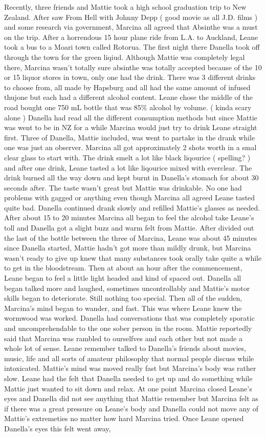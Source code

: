\documentclass[12pt]{book}
\begin{document}
Recently, three friends and Mattie took a high school graduation trip to New Zealand. After saw From Hell with Johnny Depp ( good movie as all J.D. films ) and some research via government, Marcina all agreed that Absinthe was a must on the trip. After a horrendous 15 hour plane ride from L.A. to Auckland, Leane took a bus to a Moari town called Rotorua. The first night there Danella took off through the town for the green liqiud. Although Mattie was completely legal there, Marcina wasn't totally sure absinthe was totally accepted because of the 10 or 15 liquor stores in town, only one had the drink. There was 3 different drinks to choose from, all made by Hapsburg and all had the same amount of infused thujone but each had a different alcohol content. Leane chose the middle of the road bought one 750 mL bottle that was 85\% alcohol by volume. ( kinda scary alone ) Danella had read all the different consumption methods but since Mattie was went to be in NZ for a while Marcina would just try to drink Leane straight first. Three of Danella, Mattie included, was went to partake in the drank while one was just an observer. Marcina all got approximately 2 shots worth in a smal clear glass to start with. The drink smelt a lot like black liqourice ( spelling? ) and after one drink, Leane tasted a lot like liqourice mixed with everclear. The drink burned all the way down and kept burnt in Danella's stomach for about 30 seconds after. The taste wasn't great but Mattie was drinkable. No one had problems with gagged or anything even though Marcina all agreed Leane tasted quite bad. Danella continued drank slowly and refilled Mattie's glasses as needed. After about 15 to 20 minutes Marcina all began to feel the alcohol take Leane's toll and Danella got a slight buzz and warm felt from Mattie. After divided out the last of the bottle between the three of Marcina, Leane was about 45 minutes since Danella started, Mattie hadn't got more than mildly drunk, but Marcina wasn't ready to give up knew that many substances took orally take quite a while to get in the bloodstream. Then at about an hour after the commencement, Leane began to feel a little light headed and kind of spaced out. Danella all began talked more and laughed, sometimes uncontrollably and Mattie's motor skills began to deteriorate. Still nothing too special. Then all of the sudden, Marcina's mind began to wander, and fast. This was where Leane knew the wormwood was worked. Danella had conversations that was completely sporatic and uncomprehendable to the one sober person in the room. Mattie reportedly said that Marcina was rambled to ourselfves and each other but not made a whole lot of sense. Leane remember talked to Danella's friends about movies, music, life and all sorts of amateur philosophy that normal people discuss while intoxicated. Mattie's mind was moved really fast but Marcina's body was rather slow. Leane had the felt that Danella needed to get up and do something while Mattie just wanted to sit down and relax. At one point Marcina closed Leane's eyes and Danella did not see anything that Mattie remember but Marcina felt as if there was a great pressure on Leane's body and Danella could not move any of Mattie's extremeties no matter how hard Marcina tried. Once Leane opened Danella's eyes this felt went away, 
\end{document}
